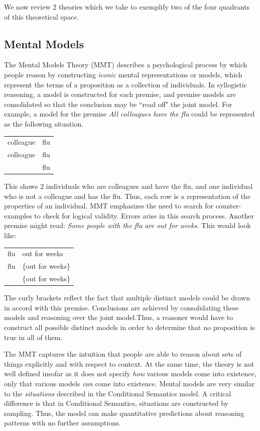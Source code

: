 \documentclass[10pt,letterpaper]{article}
\begin{document}
We now review 2 theories which we take to exemplify two of the four quadrants of this theoretical space. 

\subsection{Mental Models}
 The Mental Models Theory (MMT) describes a psychological process by which people reason by constructing {\em iconic} mental representations or models, which represent the terms of a proposition as a collection of individuals. In syllogistic reasoning, a model is constructed for each premise, and premise models are consolidated so that the conclusion may be ``read off" the joint model. For example, a model for the premise  \emph{All colleagues have the flu} could be represented as the following situation.

\begin{tabular}{l l}
colleague & flu\\
colleague & flu\\
 & flu\\
\end{tabular}

This shows 2 individuals who are colleagues and have the flu, and one individual who is not a colleague and has the flu. Thus, each row is a representation of the properties of an individual. MMT emphasizes the need to search for counter-examples to check for logical validity. Errors arise in this search process. Another premise might read: \emph{Some people with the flu are out for weeks}. This would look like:

\begin{tabular}{l l}
flu & out for weeks\\
flu & \{out for weeks\}\\
 & \{out for weeks\}\\
\end{tabular}

The curly brackets reflect the fact that multiple distinct models could be drawn in accord with this premise. Conclusions are achieved by consolidating these models and reasoning over the joint model.Thus, a reasoner would have to construct all possible distinct models in order to determine that no proposition is true in all of them. 

The MMT captures the intuition that people are able to reason about sets of things explicitly and with respect to context. At the same time, the theory is not well defined insofar as it does not specify \emph{how} various models come into existence, only that various models \emph{can} come into existence. Mental models are very similar to the \emph{situations} described in the Conditional Semantics model. A critical difference is that in Conditional Semantics, situations are constructed by sampling. Thus, the model can make quantitative predictions about reasoning patterns with no further assumptions. 
\end{document}
